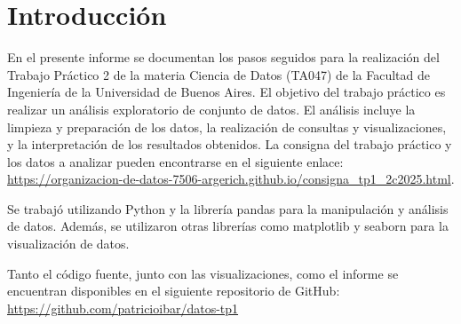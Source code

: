 \section{Introducción}
En el presente informe se documentan los pasos seguidos para la realización del Trabajo Práctico 2 de la materia Ciencia de Datos (TA047) de la Facultad de Ingeniería de la Universidad de Buenos Aires. El objetivo del trabajo práctico es realizar un análisis exploratorio de conjunto de datos. El análisis incluye la limpieza y preparación de los datos, la realización de consultas y visualizaciones, y la interpretación de los resultados obtenidos. La consigna del trabajo práctico y los datos a analizar pueden encontrarse en el siguiente enlace: \url{https://organizacion-de-datos-7506-argerich.github.io/consigna_tp1_2c2025.html}.

Se trabajó utilizando Python y la librería pandas para la manipulación y análisis de datos. Además, se utilizaron otras librerías como matplotlib y seaborn para la visualización de datos.

Tanto el código fuente, junto con las visualizaciones, como el informe se encuentran disponibles en el siguiente repositorio de GitHub: \url{https://github.com/patricioibar/datos-tp1}